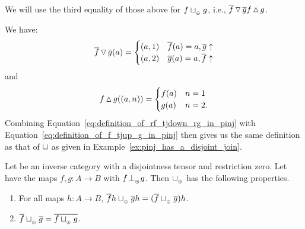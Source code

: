 \begin{example}\label{ex:tensor_join_in_pinj}
  We will use the third equality of those above for $f\sqcup_{{_{\oplus}}} g$, i.e., $\overline{f}\operatorname{\triangledown}\overline{g}
  f\operatorname{\vartriangle} g$.

  We have:
  \begin{equation}
    \overline{f}\operatorname{\triangledown}\overline{g}(a) =
    \begin{cases}
      (a,1) & \overline{f}(a) = a, \overline{g}\uparrow\\
      (a,2) & \overline{g}(a) = a, \overline{f}\uparrow
    \end{cases}\label{eq:definition_of_rf_tjdown_rg_in_pinj}
  \end{equation}
  and
  \begin{equation}
    f\operatorname{\vartriangle} g((a,n)) =
    \begin{cases}
      f(a)  & n = 1\\
      g(a)  & n=2.
    \end{cases}\label{eq:definition_of_f_tjup_g_in_pinj}
  \end{equation}
  Combining Equation~\ref{eq:definition_of_rf_tjdown_rg_in_pinj} with
  Equation~\ref{eq:definition_of_f_tjup_g_in_pinj} then gives us the same definition as that of
  $\sqcup$ as given in Example~\ref{ex:pinj_has_a_disjoint_join}.
\end{example}
\begin{lemma}\label{lem:tensor_disjoint_join_properties}
  Let \X be an inverse category with a disjointness tensor and restriction zero. Let \X have the
  maps $f,g: A \to B$ with $f{}_{{}_{}}{\perp_{{}_{\oplus}}} g$. Then $\sqcup_{{_{\oplus}}}$ has the following properties.
  \begin{enumerate}[{(}i{)}]
    \item For all maps $h:A \to B$, $\overline{f}h \sqcup_{{_{\oplus}}} \overline{g}h = (\overline{f}\sqcup_{{_{\oplus}}} \overline{g})h$.
      \label{lemitem:tdj_rst_universal}
    \item $\overline{f}\sqcup_{{_{\oplus}}} \overline{g} = \overline{f\sqcup_{{_{\oplus}}} g}$. \label{lemitem:tdj_rst_is_rst}
  \end{enumerate}
\end{lemma}
